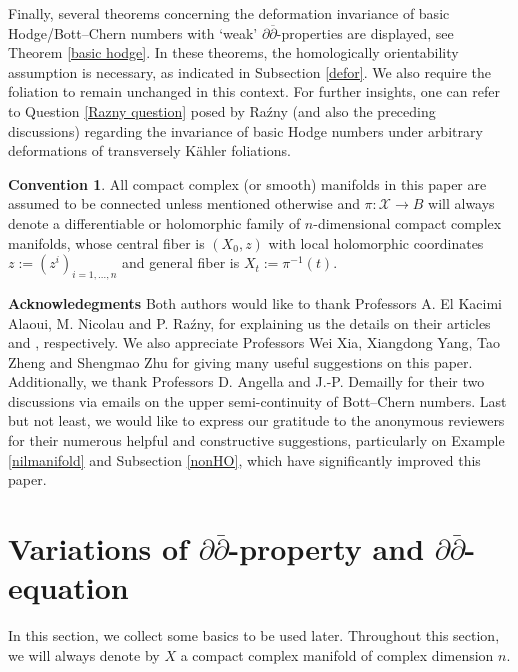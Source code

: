 \documentclass[12pt]{amsart}
\numberwithin{equation}{section}
\theoremstyle{definition}
\theoremstyle{definition}
\theoremstyle{definition}
\renewcommand{\1}{\mathsf{1}}
\renewcommand{\>}{\rightarrow}
\newcommand{\p}{\partial}
\newcommand{\bp}{\overline\partial}
\def\p{\partial}
\newtheorem*{Conventionno}{Convention}
\theoremstyle{plain} %
\theoremstyle{plain} %
\theoremstyle{plain} %
\begin{document}
	Finally, several theorems concerning the deformation invariance of basic Hodge/Bott--Chern numbers with `weak' $\p\bp$-properties are displayed, see Theorem \ref{basic hodge}. In these theorems, the homologically orientability assumption is necessary, as indicated in Subsection \ref{defor}. We also require the foliation to remain unchanged in this context. For further insights, one can refer to Question \ref{Razny question} posed by Ra\'zny (and also the preceding discussions) regarding the invariance of basic Hodge numbers under arbitrary deformations of transversely K\"ahler foliations.
	
	\begin{Conventionno}
		All compact complex (or smooth) manifolds in this paper are assumed to be connected unless mentioned otherwise and $\pi: \mathcal{X} \rightarrow B$ will always denote a differentiable or holomorphic family of $n$-dimensional compact complex manifolds, whose central fiber is $(X_0,z)$ with local holomorphic coordinates $z:=(z^i)_{i=1,\ldots,n}$ and general fiber is $X_t:=\pi^{-1}(t)$.
	\end{Conventionno}
	
	
	\noindent
\textbf{Acknowledegments}
Both authors would like to thank Professors A. El Kacimi Alaoui, M. Nicolau and P. Ra\'zny, for explaining us the details on their articles \cite{EKAN89} and \cite{Ra21}, respectively. We also appreciate Professors Wei Xia, Xiangdong Yang, Tao Zheng and Shengmao Zhu for giving many useful suggestions on this paper.  
Additionally, we thank Professors D. Angella and J.-P. Demailly for their two discussions via emails on the upper semi-continuity of Bott--Chern numbers. Last but not least, we would like to express our gratitude to the anonymous reviewers for their numerous helpful and constructive suggestions, particularly on Example \ref{nilmanifold} and Subsection \ref{nonHO}, which have significantly improved this paper.
	
	
\section{Variations of $\partial\bar\partial$-property and $\partial\bar\partial$-equation}
In this section, we collect some basics  to be used later. Throughout this section, we will always denote by $X$ a compact complex manifold of complex dimension $n$.
\end{document}
